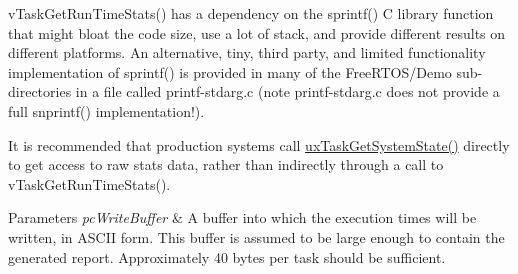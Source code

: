 v\+Task\+Get\+Run\+Time\+Stats() has a dependency on the sprintf() C library function that might bloat the code size, use a lot of stack, and provide different results on different platforms. An alternative, tiny, third party, and limited functionality implementation of sprintf() is provided in many of the Free\+R\+T\+O\+S/\+Demo sub-\/directories in a file called printf-\/stdarg.\+c (note printf-\/stdarg.\+c does not provide a full snprintf() implementation!).

It is recommended that production systems call \hyperlink{group___tasks_gaa4603f3de3d809e9beb18d10fbac005d}{ux\+Task\+Get\+System\+State()} directly to get access to raw stats data, rather than indirectly through a call to v\+Task\+Get\+Run\+Time\+Stats().


\begin{DoxyParams}{Parameters}
{\em pc\+Write\+Buffer} & A buffer into which the execution times will be written, in A\+S\+C\+II form. This buffer is assumed to be large enough to contain the generated report. Approximately 40 bytes per task should be sufficient. \\
\hline
\end{DoxyParams}
